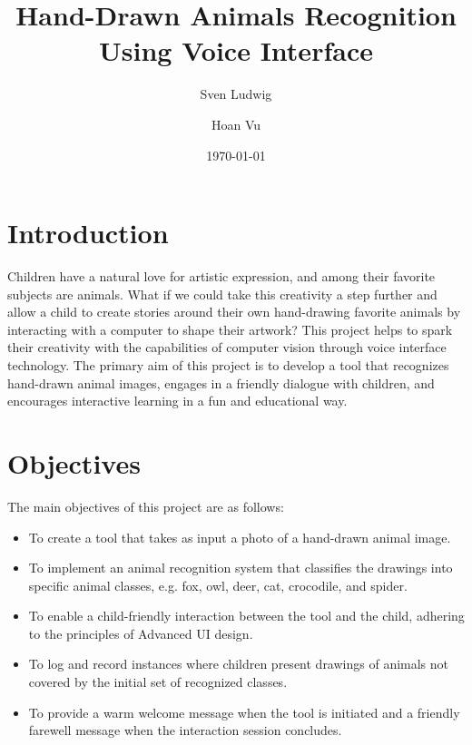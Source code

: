 

\subject{Design Document}
\title{Hand-Drawn Animals Recognition Using Voice Interface}
\author{Sven Ludwig}
\author{Hoan Vu}
\date{\today}



\maketitle

\section{Introduction}
Children have a natural love for artistic expression, and among their favorite subjects are animals. What if we could take this creativity a step further and allow a child to create stories around their own hand-drawing favorite animals by interacting with a computer to shape their artwork? This project helps to spark their creativity with the capabilities of computer vision through voice interface technology. The primary aim of this project is to develop a tool that recognizes hand-drawn animal images, engages in a friendly dialogue with children, and encourages interactive learning in a fun and educational way.

\section{Objectives}
The main objectives of this project are as follows:

\begin{itemize}
  \item To create a tool that takes as input a photo of a hand-drawn animal image.
  \item To implement an animal recognition system that classifies the drawings into specific animal classes, e.g. fox, owl, deer, cat, crocodile, and spider.
  \item To enable a child-friendly interaction between the tool and the child, adhering to the principles of Advanced UI design.
  \item To log and record instances where children present drawings of animals not covered by the initial set of recognized classes.
  \item To provide a warm welcome message when the tool is initiated and a friendly farewell message when the interaction session concludes.
\end{itemize}


